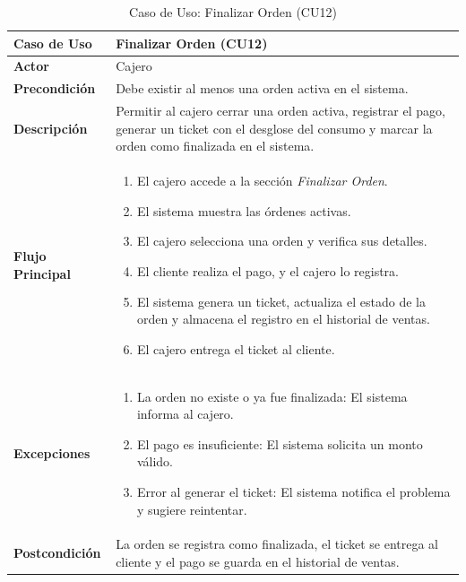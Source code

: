 \documentclass{article}
\begin{document}
\begin{table}[H]
    \centering
    \begin{tabular}{|p{3.5cm}|p{10cm}|}
    \hline
    \textbf{Caso de Uso}   & Finalizar Orden (CU12) \\ \hline
    \textbf{Actor}         & Cajero \\ \hline
    \textbf{Precondición}  & 
    Debe existir al menos una orden activa en el sistema. \\ \hline
    \textbf{Descripción}   & 
    Permitir al cajero cerrar una orden activa, registrar el pago, generar un ticket con el desglose del consumo y marcar la orden como finalizada en el sistema. \\ \hline
    \textbf{Flujo Principal} & 
    \begin{enumerate}
        \item El cajero accede a la sección \textit{Finalizar Orden}.
        \item El sistema muestra las órdenes activas.
        \item El cajero selecciona una orden y verifica sus detalles.
        \item El cliente realiza el pago, y el cajero lo registra.
        \item El sistema genera un ticket, actualiza el estado de la orden y almacena el registro en el historial de ventas.
        \item El cajero entrega el ticket al cliente.
    \end{enumerate} \\ \hline
    \textbf{Excepciones}   & 
    \begin{enumerate}
        \item La orden no existe o ya fue finalizada: El sistema informa al cajero.
        \item El pago es insuficiente: El sistema solicita un monto válido.
        \item Error al generar el ticket: El sistema notifica el problema y sugiere reintentar.
    \end{enumerate} \\ \hline
    \textbf{Postcondición} & 
    La orden se registra como finalizada, el ticket se entrega al cliente y el pago se guarda en el historial de ventas. \\ \hline
    \end{tabular}
    \caption{Caso de Uso: Finalizar Orden (CU12)}
    \label{tab:cu12}
\end{table}
\end{document}
